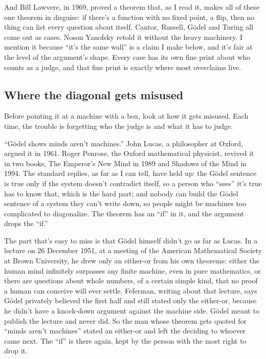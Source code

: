 \documentclass[11pt,twoside]{article}
\theoremstyle{thielethm}
\theoremstyle{thieledef}
\theoremstyle{thieledef}
\theoremstyle{thieledef}
\theoremstyle{thielethm}
\theoremstyle{thieleobs}
\theoremstyle{thielethm}
\begin{document}
And Bill Lawvere, in 1969, proved a theorem that, as I read it, makes all of these one theorem in disguise: if there's a function with no fixed point, a flip, then no thing can list every question about itself. Cantor, Russell, Gödel and Turing all come out as cases. Noson Yanofsky retold it without the heavy machinery. I mention it because ``it's the same wall'' is a claim I make below, and it's fair at the level of the argument's shape. Every case has its own fine print about who counts as a judge, and that fine print is exactly where most overclaims live.

\subsection{Where the diagonal gets misused}

Before pointing it at a machine with a box, look at how it gets misused. Each time, the trouble is forgetting who the judge is and what it has to judge.

``Gödel shows minds aren't machines.'' John Lucas, a philosopher at Oxford, argued it in 1961. Roger Penrose, the Oxford mathematical physicist, revived it in two books, The Emperor's New Mind in 1989 and Shadows of the Mind in 1994. The standard replies, as far as I can tell, have held up: the Gödel sentence is true only if the system doesn't contradict itself, so a person who ``sees'' it's true has to know that, which is the hard part; and nobody can build the Gödel sentence of a system they can't write down, so people might be machines too complicated to diagonalize. The theorem has an ``if'' in it, and the argument drops the ``if.''

The part that's easy to miss is that Gödel himself didn't go as far as Lucas. In a lecture on 26 December 1951, at a meeting of the American Mathematical Society at Brown University, he drew only an either-or from his own theorems: either the human mind infinitely surpasses any finite machine, even in pure mathematics, or there are questions about whole numbers, of a certain simple kind, that no proof a human can conceive will ever settle. Feferman, writing about that lecture, says Gödel privately believed the first half and still stated only the either-or, because he didn't have a knock-down argument against the machine side. Gödel meant to publish the lecture and never did. So the man whose theorem gets quoted for ``minds aren't machines'' stated an either-or and left the deciding to whoever came next. The ``if'' is there again, kept by the person with the most right to drop it.
\end{document}
